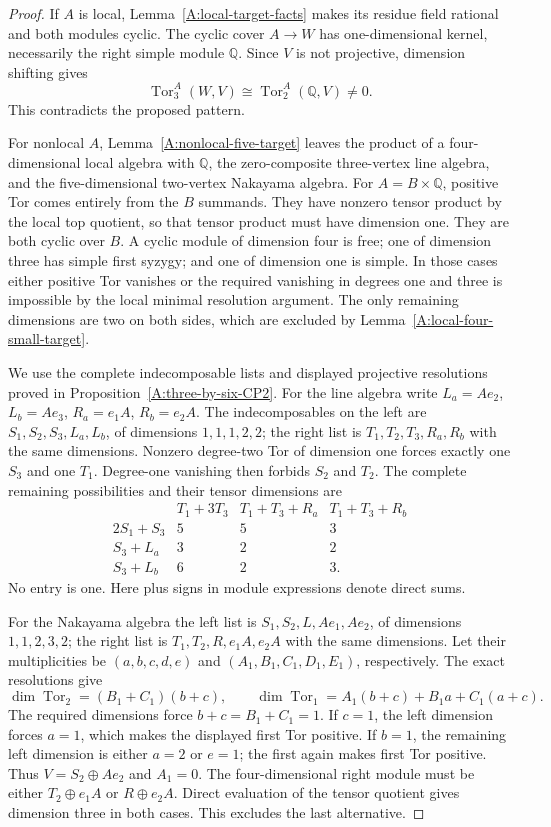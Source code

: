 \begin{proof}
If $A$ is local, Lemma~\ref{A:local-target-facts} makes its
residue field rational and both modules cyclic. The cyclic
cover $A\to W$ has one-dimensional kernel, necessarily the
right simple module $\mathbb Q$. Since $V$ is not projective,
dimension shifting gives
\[
 \operatorname{Tor}_3^A(W,V)
   \cong\operatorname{Tor}_2^A(\mathbb Q,V)\ne0.
\]
This contradicts the proposed pattern.

For nonlocal $A$, Lemma~\ref{A:nonlocal-five-target} leaves
the product of a four-dimensional local algebra with
$\mathbb Q$, the zero-composite three-vertex line algebra,
and the five-dimensional two-vertex Nakayama algebra.
For $A=B\times\mathbb Q$, positive Tor comes entirely from
the $B$ summands. They have nonzero tensor product by the
local top quotient, so that tensor product must have dimension
one. They are both cyclic over $B$. A cyclic module of
dimension four is free; one of dimension three has simple
first syzygy; and one of dimension one is simple. In those
cases either positive Tor vanishes or the required vanishing
in degrees one and three is impossible by the local minimal
resolution argument. The only remaining dimensions are two
on both sides, which are excluded by
Lemma~\ref{A:local-four-small-target}.

We use the complete indecomposable lists and displayed
projective resolutions proved in
Proposition~\ref{A:three-by-six-CP2}. For the line algebra
write $L_a=Ae_2$, $L_b=Ae_3$, $R_a=e_1A$, $R_b=e_2A$.
The indecomposables on the left are
$S_1,S_2,S_3,L_a,L_b$, of dimensions $1,1,1,2,2$;
the right list is $T_1,T_2,T_3,R_a,R_b$ with the same
dimensions. Nonzero degree-two Tor of dimension one forces
exactly one $S_3$ and one $T_1$. Degree-one vanishing then
forbids $S_2$ and $T_2$. The complete remaining possibilities
and their tensor dimensions are
\[
\begin{array}{c|ccc}
 &T_1+3T_3&T_1+T_3+R_a&T_1+T_3+R_b\\\hline
 2S_1+S_3&5&5&3\\
 S_3+L_a&3&2&2\\
 S_3+L_b&6&2&3.
\end{array}
\]
No entry is one. Here plus signs in module expressions
denote direct sums.

For the Nakayama algebra the left list is
$S_1,S_2,L,Ae_1,Ae_2$, of dimensions $1,1,2,3,2$;
the right list is $T_1,T_2,R,e_1A,e_2A$ with the same
dimensions. Let their multiplicities be
$(a,b,c,d,e)$ and $(A_1,B_1,C_1,D_1,E_1)$, respectively.
The exact resolutions give
\[
 \dim\operatorname{Tor}_2=(B_1+C_1)(b+c),\qquad
 \dim\operatorname{Tor}_1
   =A_1(b+c)+B_1a+C_1(a+c).
\]
The required dimensions force $b+c=B_1+C_1=1$.
If $c=1$, the left dimension forces $a=1$, which makes
the displayed first Tor positive. If $b=1$, the remaining
left dimension is either $a=2$ or $e=1$; the first again
makes first Tor positive. Thus $V=S_2\oplus Ae_2$ and
$A_1=0$. The four-dimensional right module must be either
$T_2\oplus e_1A$ or $R\oplus e_2A$. Direct evaluation of
the tensor quotient gives dimension three in both cases.
This excludes the last alternative.


\end{proof}
